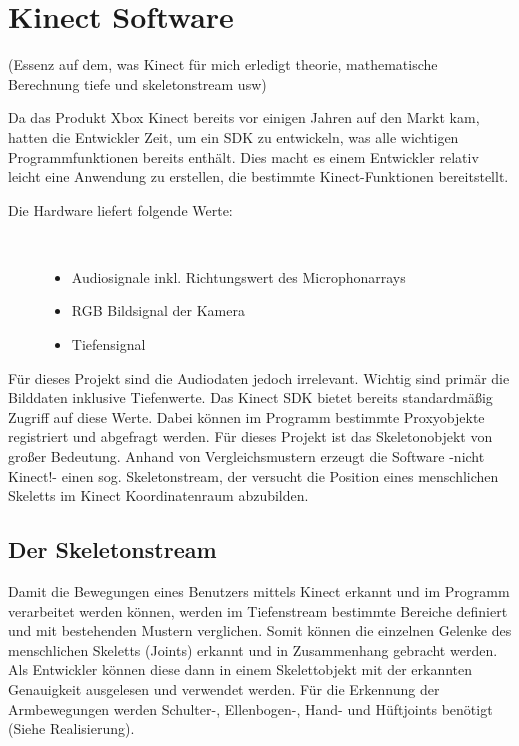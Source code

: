 \section{Kinect Software}\label{Software}

(Essenz auf dem, was Kinect für mich erledigt theorie, mathematische Berechnung tiefe und skeletonstream usw)

Da das Produkt Xbox Kinect bereits vor einigen Jahren auf den Markt kam, hatten die Entwickler Zeit, um ein SDK zu entwickeln, was alle wichtigen Programmfunktionen bereits enthält. Dies macht es einem Entwickler relativ leicht eine Anwendung zu erstellen, die bestimmte Kinect-Funktionen bereitstellt. 

\begin{description}
	\item[Die Hardware liefert folgende Werte:]~\par
	\begin{itemize}
		\item Audiosignale inkl. Richtungswert des Microphonarrays
		\item RGB Bildsignal der Kamera
		\item Tiefensignal
	\end{itemize}
\end{description}

\noindent
Für dieses Projekt sind die Audiodaten jedoch irrelevant. Wichtig sind primär die Bilddaten inklusive Tiefenwerte.
Das Kinect SDK bietet bereits standardmäßig Zugriff auf diese Werte. Dabei können im Programm bestimmte Proxyobjekte registriert und abgefragt werden. Für dieses Projekt ist das Skeletonobjekt von großer Bedeutung. Anhand von Vergleichsmustern erzeugt die Software -nicht Kinect!- einen sog. Skeletonstream, der versucht die Position eines menschlichen Skeletts im Kinect Koordinatenraum abzubilden.\cite{SWB-376536934}

\subsection{Der Skeletonstream}
Damit die Bewegungen eines Benutzers mittels Kinect erkannt und im Programm verarbeitet werden können, werden im Tiefenstream bestimmte Bereiche definiert und mit bestehenden Mustern verglichen. Somit können die einzelnen Gelenke des menschlichen Skeletts (Joints) erkannt und in Zusammenhang gebracht werden. Als Entwickler können diese dann in einem Skelettobjekt mit der erkannten Genauigkeit ausgelesen und verwendet werden. Für die Erkennung der Armbewegungen werden Schulter-, Ellenbogen-, Hand- und Hüftjoints benötigt (Siehe Realisierung).

